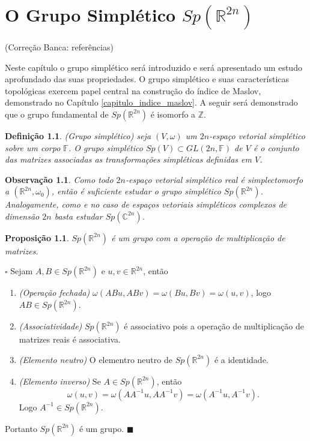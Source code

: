 \documentclass[12pt]{book}
\newtheorem{definicao}[teorema]{Definição}
\newtheorem{observacao}[teorema]{Observação}
\newtheorem{proposicao}[teorema]{Proposição}
\newenvironment{prova}[1]{$\square$ #1}{\hfill$\blacksquare$}
\newcommand{\complexo}[1]{\mathbb{C}^{#1}}
\newcommand{\gruposimpletico}[1]{Sp(#1)}
\newcommand{\inteiros}{\mathbb{Z}}
\newcommand{\real}[1]{\mathbb{R}^{#1}}
\newcommand{\alerta}[1]{{\color{red}#1}}
\newcommand{\correcaobanca}[1]{\alerta{(Correção Banca: #1)}}
\begin{document}
	\chapter{O Grupo Simplético $\gruposimpletico{\real{2n}}$}\label{capitulo_grupo_simpletico}
	\correcaobanca{referências}
	
	Neste capítulo o grupo simplético será introduzido e será apresentado um estudo aprofundado das suas propriedades. O grupo simplético e suas características topológicas exercem papel central na construção do índice de Maslov, demonstrado no Capítulo \ref{capitulo_indice_maslov}. A seguir será demonstrado que o grupo fundamental de $\gruposimpletico{\real{2n}}$ é isomorfo a $\inteiros$.

	\begin{definicao}\label{definicao_grupo_simpletico}
		(Grupo simplético) seja $(V, \omega)$ um $2n$-espaço vetorial simplético sobre um corpo $\mathbb{F}$. O grupo simplético $\gruposimpletico{V} \subset GL(2n, \mathbb{F})$ de $V$ é o conjunto das matrizes associadas as transformações simpléticas definidas em $V$.
	\end{definicao}


	\begin{observacao}
		Como todo $2n$-espaço vetorial simplético real é simplectomorfo a $(\real{2n}, \omega_{0})$, então é suficiente estudar o grupo simplético $\gruposimpletico{\real{2n}}$. Analogamente, como  e no caso de espaços vetoriais simpléticos complexos de dimensão $2n$ basta estudar $\gruposimpletico{\complexo{2n}}$. 
	\end{observacao}
	
	\begin{proposicao}\label{proposicao_grupo_simpletico_estrutura_grupo}
		$\gruposimpletico{\real{2n}}$ é um grupo com a operação de multiplicação de matrizes.
	\end{proposicao}
	\begin{prova}
		Sejam $A,B \in \gruposimpletico{\real{2n}}$ e $u,v \in \real{2n}$, então
		\begin{enumerate}
			\item \textit{(Operação fechada)} $\omega(ABu, ABv) = \omega(Bu, Bv) = \omega(u,v)$, logo $AB \in \gruposimpletico{\real{2n}}$.
			
			\item \textit{(Associatividade)} $\gruposimpletico{\real{2n}}$ é associativo pois a operação de multiplicação de matrizes reais é associativa.
			
			\item \textit{(Elemento neutro)} O elementro neutro de $\gruposimpletico{\real{2n}}$ é a identidade.
			
			\item \textit{(Elemento inverso)} Se $A \in \gruposimpletico{\real{2n}}$, então $$
			\omega(u, v)=\omega(AA^{-1}u, AA^{-1}v) = \omega(A^{-1}u, A^{-1}v).
			$$
			Logo $A^{-1} \in \gruposimpletico{\real{2n}}$. 
		\end{enumerate}
		Portanto $\gruposimpletico{\real{2n}}$ é um grupo.
	\end{prova}
	
\end{document}
